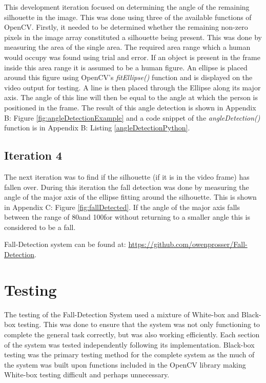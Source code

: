 \documentclass[11pt,a4paper]{report}
\begin{document}
This development iteration focused on determining the angle of the remaining silhouette in the image. This was done using three of the available functions of OpenCV. Firstly, it needed to be determined whether the remaining non-zero pixels in the image array constituted a silhouette being present. This was done by measuring the area of the single area. The required area range which a human would occupy was found using trial and error. If an object is present in the frame inside this area range it is assumed to be a human figure. An ellipse is placed around this figure using OpenCV's \textit{fitEllipse()} function and is displayed on the video output for testing. A line is then placed through the Ellipse along its major axis. The angle of this line will then be equal to the angle at which the person is positioned in the frame. The result of this angle detection is shown in Appendix B: Figure \ref{fig:angleDetectionExample} and a code snippet of the \textit{angleDetection()} function is in Appendix B: Listing \ref{angleDetectionPython}.

\subsection{Iteration 4}
The next iteration was to find if the silhouette (if it is in the video frame) has fallen over. During this iteration the fall detection was done by measuring the angle of the major axis of the ellipse fitting around the silhouette. This is shown in Appendix C: Figure \ref{fig:fallDetected}. If the angle of the major axis falls between the range of 80\textdegree and 100\textdegree for without returning to a smaller angle this is considered to be a fall.
\begin{flushleft}
Fall-Detection system can be found at: \url{https://github.com/owenprosser/Fall-Detection}.
\end{flushleft}
\section{Testing}
The testing of the Fall-Detection System used a mixture of White-box and Black-box testing. This was done to ensure that the system was not only functioning to complete the general task correctly, but was also working efficiently. Each section of the system was tested independently following its implementation. Black-box testing was the primary testing method for the complete system as the much of the system was built upon functions included in the OpenCV library making White-box testing difficult and perhaps unnecessary.
\end{document}
